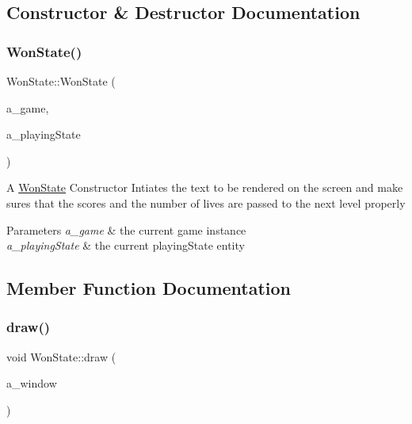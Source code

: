 \subsection{Constructor \& Destructor Documentation}
\mbox{\label{class_won_state_ac6d2bf732076e157c50066c8c0331f73}} 
\subsubsection{\texorpdfstring{Won\+State()}{WonState()}}
{\footnotesize\ttfamily Won\+State\+::\+Won\+State (\begin{DoxyParamCaption}\item[{\hyperlink{class_game}{Game} $\ast$}]{a\+\_\+game,  }\item[{\hyperlink{class_game_state}{Game\+State} $\ast$}]{a\+\_\+playing\+State }\end{DoxyParamCaption})}

A \hyperlink{class_won_state}{Won\+State} Constructor Intiates the text to be rendered on the screen and make sures that the scores and the number of lives are passed to the next level properly 
\begin{DoxyParams}{Parameters}
{\em a\+\_\+game} & the current game instance \\
\hline
{\em a\+\_\+playing\+State} & the current playing\+State entity \\
\hline
\end{DoxyParams}


\subsection{Member Function Documentation}
\mbox{\label{class_won_state_a88bcef07ae234fe7ba672d1c6628d2c0}} 
\subsubsection{\texorpdfstring{draw()}{draw()}}
{\footnotesize\ttfamily void Won\+State\+::draw (\begin{DoxyParamCaption}\item[{sf\+::\+Render\+Window \&}]{a\+\_\+window }\end{DoxyParamCaption})\hspace{0.3cm}{\ttfamily [virtual]}}


